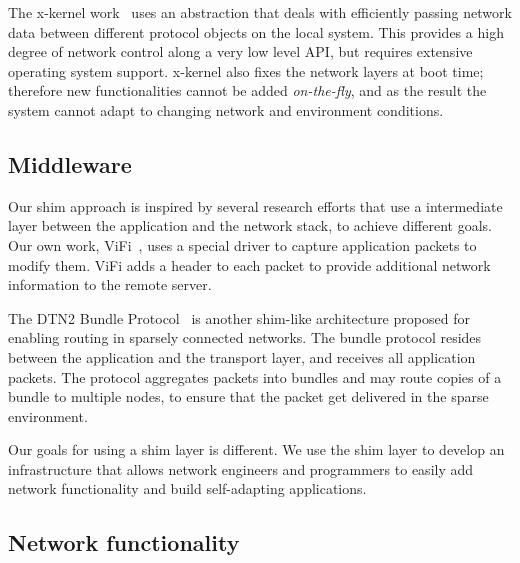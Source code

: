 
The x-kernel work~\cite{hutchinson1991x,hutchinson23rpc,peterson1990x} uses 
an abstraction that deals with efficiently passing network
data between different protocol objects on the local system.   This provides 
a high degree of network control along a very low level API, but requires
extensive operating system support.  x-kernel also fixes the network layers 
at boot time; therefore new functionalities cannot be added {\em on-the-fly}, 
and as the result the system cannot adapt to changing network and environment 
conditions.

\subsection{Middleware}

Our shim approach is inspired by several research efforts that use a 
intermediate layer between the application and the network stack, to 
achieve different goals. Our own work, ViFi~\cite{vifi}, uses a special 
driver to capture application packets to modify them. ViFi adds a header 
to each packet to provide additional network information to the remote 
server. 

The DTN2 Bundle Protocol~\cite{dtn_bundle} is another shim-like architecture 
proposed for enabling routing in sparsely connected networks. The bundle 
protocol resides between the application and the transport layer, and 
receives all application packets. The protocol aggregates packets into 
bundles and may route copies of a bundle to multiple nodes, to ensure 
that the packet get delivered in the sparse environment. 


Our goals for using a shim layer is different. We use the 
shim layer to develop an infrastructure that allows network engineers 
and programmers to easily add network functionality and build 
self-adapting applications. 

\subsection{Network functionality} 

